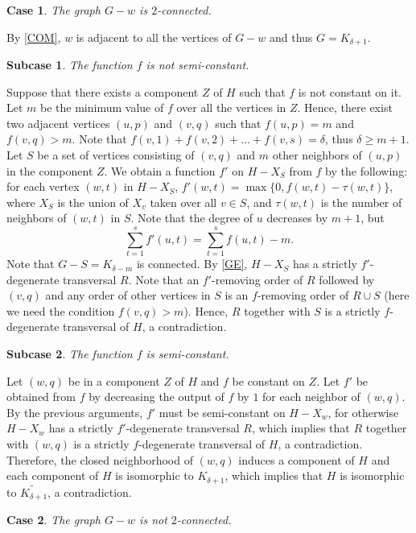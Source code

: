 \documentclass{article}
\makeatletter
\renewenvironment{proof}[1][\proofname]{\par
  \pushQED{\qed}%
  \normalfont \topsep6\p@\@plus6\p@\relax
  \trivlist
  \item[\hskip\labelsep
        \bfseries
    #1\@addpunct{.}]\ignorespaces
}{%
  \popQED\endtrivlist\@endpefalse
}
\newtheorem{case}{Case}
\newtheorem{subcase}{Subcase}[case]
\theoremstyle{definition}
\makeatother
\begin{document}
\begin{proof}[Proof of \autoref{MR}]
\begin{case}
The graph $G - w$ is $2$-connected.
\end{case}
By \autoref{COM}, $w$ is adjacent to all the vertices of $G - w$ and thus $G = K_{\delta + 1}$. 

\begin{subcase}
The function $f$ is not semi-constant. 
\end{subcase}
Suppose that there exists a component $Z$ of $H$ such that $f$ is not constant on it. Let $m$ be the minimum value of $f$ over all the vertices in $Z$. Hence, there exist two adjacent vertices $(u, p)$ and $(v, q)$ such that $f(u, p) = m$ and $f(v, q) > m$. Note that $f(v, 1) + f(v, 2) + \dots + f(v, s) = \delta$, thus $\delta \geq m + 1$. Let $S$ be a set of vertices consisting of $(v, q)$ and $m$ other neighbors of $(u, p)$ in the component $Z$. We obtain a function $f'$ on $H - X_{S}$ from $f$ by the following: for each vertex $(w, t)$ in $H - X_{S}$, $f'(w, t) = \max\big\{0, f(w, t) - \tau(w, t)\big\}$, where $X_{S}$ is the union of $X_{v}$ taken over all $v \in S$, and $\tau(w, t)$ is the number of neighbors of $(w, t)$ in $S$. Note that the degree of $u$ decreases by $m+1$, but 
\begin{equation*}
\sum_{t=1}^{s} f'(u, t) = \sum_{t=1}^{s} f(u, t) - m. 
\end{equation*}
Note that $G - S = K_{\delta - m}$ is connected. By \autoref{GE}, $H - X_{S}$ has a strictly $f'$-degenerate transversal $R$. Note that an $f'$-removing order of $R$ followed by $(v, q)$ and any order of other vertices in $S$ is an $f$-removing order of $R \cup S$  (here we need the condition $f(v, q) > m$). Hence, $R$ together with $S$ is a strictly $f$-degenerate transversal of $H$, a contradiction. 
\begin{subcase}
The function $f$ is semi-constant. 
\end{subcase}
Let $(w, q)$ be in a component $Z$ of $H$ and $f$ be constant on $Z$. Let $f'$ be obtained from $f$ by decreasing the output of $f$ by $1$ for each neighbor of $(w, q)$. By the previous arguments, $f'$ must be semi-constant on $H - X_{w}$, for otherwise $H - X_{w}$ has a strictly $f'$-degenerate transversal $R$, which implies that $R$ together with $(w, q)$ is a strictly $f$-degenerate transversal of $H$, a contradiction. Therefore, the closed neighborhood of $(w, q)$ induces a component of $H$ and each component of $H$ is isomorphic to $K_{\delta+1}$, which implies that $H$ is isomorphic to $\widetilde{K_{\delta + 1}}$, a contradiction. 
\begin{case}
The graph $G - w$ is not $2$-connected. 
\end{case}


\end{proof}
\end{document}

